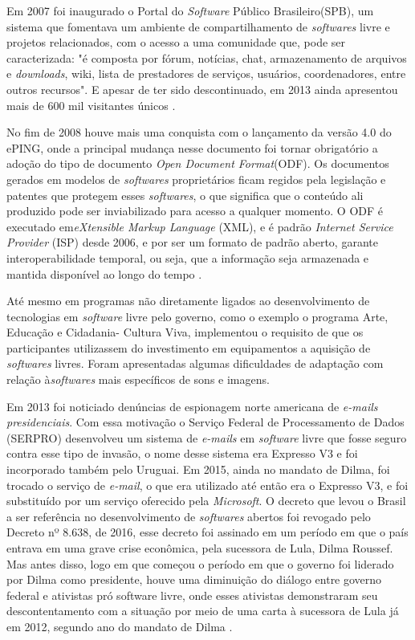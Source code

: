 \documentclass[12pt]{article}
\begin{document}
Em 2007 foi inaugurado o Portal do \textit{Software} Público Brasileiro(SPB), um sistema que fomentava um ambiente de compartilhamento de \textit{softwares} livre e projetos relacionados, com o acesso a uma comunidade que, pode ser caracterizada: "é composta por fórum, notícias, chat, armazenamento de arquivos e \textit{downloads}, wiki, lista de prestadores de serviços, usuários, coordenadores, entre outros recursos". E apesar de ter sido descontinuado, em 2013 ainda apresentou mais de 600 mil visitantes únicos \cite{de2014evoluccao}.

No fim de 2008 houve mais uma conquista com o lançamento da versão 4.0 do ePING, onde a principal mudança nesse documento foi tornar obrigatório a adoção do tipo de documento \textit{Open Document Format}(ODF). Os documentos gerados em modelos de \textit{softwares} proprietários ficam regidos pela legislação e patentes que protegem esses \textit{softwares}, o que significa que o conteúdo ali produzido pode ser inviabilizado para acesso a qualquer momento. O ODF é executado em\textit{eXtensible Markup Language} (XML), e é padrão \textit{Internet Service Provider} (ISP) desde 2006, e por ser um formato de padrão aberto, garante interoperabilidade temporal, ou seja, que a informação seja armazenada e mantida disponível ao longo do tempo \cite{yamaoka2013preservaccao}.

Até mesmo em programas não diretamente ligados ao desenvolvimento de tecnologias em \textit{software} livre pelo governo, como o exemplo o programa Arte, Educação e Cidadania- Cultura Viva, implementou o requisito de que os participantes utilizassem do investimento em equipamentos a aquisição de \textit{softwares} livres. Foram apresentadas algumas dificuldades de adaptação com relação à\textit{softwares} mais específicos de sons e imagens\cite{silva2010cultura}.

Em 2013 foi noticiado denúncias de espionagem norte americana de \textit{e-mails presidenciais}. Com essa motivação o Serviço Federal de Processamento de Dados (SERPRO) desenvolveu um sistema de \textit{e-mails} em \textit{software} livre que fosse seguro contra esse tipo de invasão, o nome desse sistema era Expresso V3 e foi incorporado também pelo Uruguai\cite{g12014}.
Em 2015, ainda no mandato de Dilma, foi trocado o serviço de \textit{e-mail}, o que era utilizado até então era o Expresso V3, e foi substituído por um serviço oferecido pela \textit{Microsoft}\cite{torres2018software}.
O decreto que levou o Brasil a ser referência no desenvolvimento de \textit{softwares} abertos foi revogado pelo Decreto nº 8.638, de 2016, esse decreto foi assinado em um período em que o país entrava em uma grave crise econômica, pela sucessora de Lula, Dilma Roussef. Mas antes disso, logo em que começou o período em que o governo foi liderado por Dilma como presidente, houve uma diminuição do diálogo entre governo federal e ativistas pró software livre, onde esses ativistas demonstraram seu descontentamento com a situação por meio de uma carta à sucessora de Lula já em 2012, segundo ano do mandato de Dilma \cite{torres2018software}.
\end{document}
